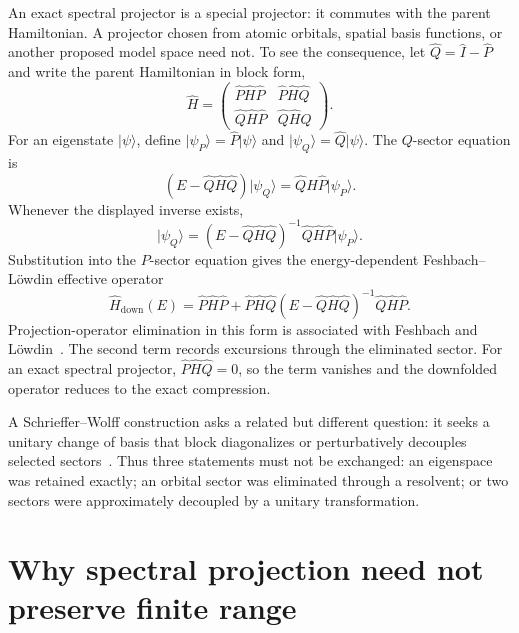 An exact spectral projector is a special projector: it commutes with the parent
Hamiltonian. A projector chosen from atomic orbitals, spatial basis functions,
or another proposed model space need not. To see the consequence, let
\(\hat Q=\hat I-\hat P\) and write the parent Hamiltonian in block form,
\begin{equation}
  \hat H=
  \begin{pmatrix}
    \hat P\hat H\hat P & \hat P\hat H\hat Q\\
    \hat Q\hat H\hat P & \hat Q\hat H\hat Q
  \end{pmatrix}.
\end{equation}
For an eigenstate \(\lvert\psi\rangle\), define
\(\lvert\psi_P\rangle=\hat P\lvert\psi\rangle\) and
\(\lvert\psi_Q\rangle=\hat Q\lvert\psi\rangle\). The \(Q\)-sector equation is
\begin{equation}
  (E-\hat Q\hat H\hat Q)\lvert\psi_Q\rangle
  =\hat Q\hat H\hat P\lvert\psi_P\rangle.
\end{equation}
Whenever the displayed inverse exists,
\begin{equation}
  \lvert\psi_Q\rangle
  =(E-\hat Q\hat H\hat Q)^{-1}
    \hat Q\hat H\hat P\lvert\psi_P\rangle.
\end{equation}
Substitution into the \(P\)-sector equation gives the energy-dependent
Feshbach--L\"owdin effective operator
\begin{equation}
  \hat H_{\mathrm{down}}(E)
  =\hat P\hat H\hat P
   +\hat P\hat H\hat Q
    (E-\hat Q\hat H\hat Q)^{-1}
    \hat Q\hat H\hat P.
\end{equation}
Projection-operator elimination in this form is associated with Feshbach and
L\"owdin~\cite{feshbach1958,lowdin1962}. The second term records excursions
through the eliminated sector. For an exact spectral projector,
\(\hat P\hat H\hat Q=0\), so the term vanishes and the downfolded operator
reduces to the exact compression.

A Schrieffer--Wolff construction asks a related but different question: it seeks
a unitary change of basis that block diagonalizes or perturbatively decouples
selected sectors~\cite{bravyi2011}. Thus three statements must not be exchanged:
an eigenspace was retained exactly; an orbital sector was eliminated through a
resolvent; or two sectors were approximately decoupled by a unitary
transformation.

\section{Why spectral projection need not preserve finite range}

